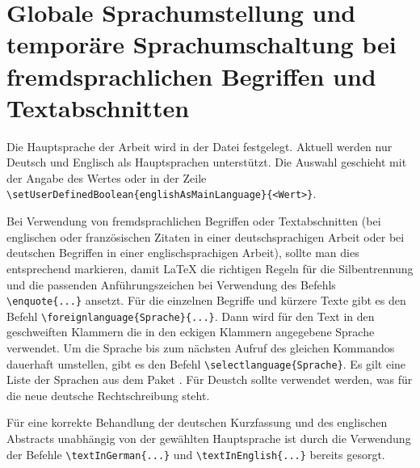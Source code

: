 \section[Globale Sprachumstellung und temporäre Sprachumschaltung]{Globale Sprachumstellung und temporäre Sprachumschaltung bei fremdsprachlichen Begriffen und Textabschnitten}%
%
%
%
%
\label{sec:Sprache}
%
Die Hauptsprache der Arbeit wird in der Datei  festgelegt.
Aktuell werden nur Deutsch und Englisch als Hauptsprachen unterstützt.
Die Auswahl geschieht mit der Angabe des Wertes  oder 
in der Zeile \lstinline|\setUserDefinedBoolean{englishAsMainLanguage}{<Wert>}|.

Bei Verwendung von fremdsprachlichen Begriffen oder Textabschnitten
(\zB bei englischen oder französischen Zitaten in einer deutschsprachigen Arbeit
oder bei deutschen Begriffen in einer englischsprachigen Arbeit),
sollte man dies entsprechend markieren,
damit \LaTeX{} die richtigen Regeln für die Silbentrennung
und die passenden Anführungszeichen bei Verwendung des Befehls
\lstinline|\enquote{...}| ansetzt.
Für die einzelnen Begriffe und kürzere Texte gibt es den Befehl
\lstinline|\foreignlanguage{Sprache}{...}|.
Dann wird für den Text in den geschweiften Klammern die in den eckigen Klammern angegebene Sprache verwendet.
Um die Sprache bis zum nächsten Aufruf des gleichen Kommandos dauerhaft umstellen,
gibt es den Befehl \lstinline|\selectlanguage{Sprache}|.
Es gilt eine Liste der Sprachen aus dem Paket .
Für Deustch sollte  verwendet werden, was für die
neue deutsche Rechtschreibung steht.

Für eine korrekte Behandlung der deutschen Kurzfassung und des englischen Abstracts
unabhängig von der gewählten Hauptsprache ist durch die Verwendung der Befehle
\lstinline|\textInGerman{...}| und \lstinline|\textInEnglish{...}| bereits gesorgt.
